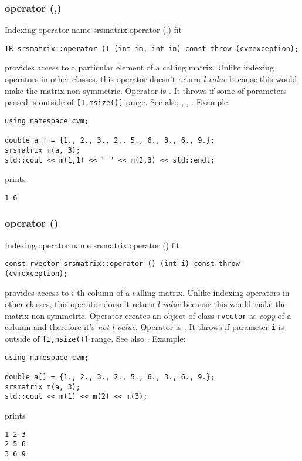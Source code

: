 \subsubsection{operator (,)}
Indexing operator%
\pdfdest name {srsmatrix.operator (,)} fit
\begin{verbatim}
TR srsmatrix::operator () (int im, int in) const throw (cvmexception);
\end{verbatim}
provides access to a particular element of a calling matrix. 
Unlike indexing operators in other classes,
this operator doesn't return  \emph{l-value}
because this would make the matrix non-symmetric.
Operator is \Based.
It throws 
if some of parameters passed
is outside of \verb"[1,msize()]" range.
See also ,
,
.
Example:
\begin{Verbatim}
using namespace cvm;

double a[] = {1., 2., 3., 2., 5., 6., 3., 6., 9.};
srsmatrix m(a, 3);
std::cout << m(1,1) << " " << m(2,3) << std::endl;
\end{Verbatim}
prints
\begin{Verbatim}
1 6
\end{Verbatim}
\newpage



\subsubsection{operator ()}
Indexing operator%
\pdfdest name {srsmatrix.operator ()} fit
\begin{verbatim}
const rvector srsmatrix::operator () (int i) const throw (cvmexception);
\end{verbatim}
provides access to \hbox{$i$-th} column of a calling matrix.
Unlike indexing operators in other classes,
this operator doesn't return  \emph{l-value}
because this would make the matrix non-symmetric.
Operator creates an object of class \verb"rvector"
as  \emph{copy} of a column and therefore it's
\emph{not  l-value}.
Operator is \Based.
It throws 
if parameter \verb"i" is outside of \verb"[1,nsize()]" range.
See also .
Example:
\begin{Verbatim}
using namespace cvm;

double a[] = {1., 2., 3., 2., 5., 6., 3., 6., 9.};
srsmatrix m(a, 3);
std::cout << m(1) << m(2) << m(3);
\end{Verbatim}
prints
\begin{Verbatim}
1 2 3
2 5 6
3 6 9
\end{Verbatim}
\newpage



